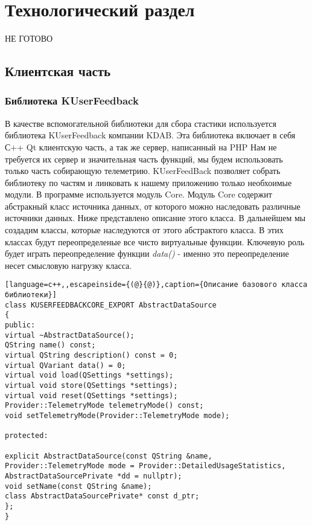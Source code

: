 \chapter{Технологический раздел}
НЕ ГОТОВО
\section{Клиентская часть}

\subsection{Библиотека KUserFeedback}

В качестве вспомогательной библиотеки для сбора стастики используется библиотека KUserFeedback компании KDAB. Эта библиотека включает в себя С++ Qt клиентскую часть, а так же сервер, написанный на PHP\cite{book3} Нам не требуется их сервер и значительная часть функций, мы будем использовать только часть собирающую телеметрию. KUserFeedBack позволяет  собрать библиотеку по частям и линковать к нашему приложению только необхоимые модули. В программе используется модуль Core. Модуль Core содержит абстракный класс источника данных, от которого можно наследовать различные источники данных. Ниже представлено описание этого класса. В дальнейшем мы создадим классы, которые наследуются от этого абстрактого класса. В этих классах будут переопределеные все чисто виртуальные функции. Ключевую роль будет играть переопределение функции \textit{data()} - именно это переопределение несет смысловую нагрузку класса.
\begin{lstlisting}[language=c++,,escapeinside={(@}{@)},caption={Описание базового класса библиотеки}] 
class KUSERFEEDBACKCORE_EXPORT AbstractDataSource
{
public:
virtual ~AbstractDataSource();
QString name() const;
virtual QString description() const = 0;
virtual QVariant data() = 0;
virtual void load(QSettings *settings);  
virtual void store(QSettings *settings);
virtual void reset(QSettings *settings);
Provider::TelemetryMode telemetryMode() const;
void setTelemetryMode(Provider::TelemetryMode mode);

protected:

explicit AbstractDataSource(const QString &name, Provider::TelemetryMode mode = Provider::DetailedUsageStatistics, AbstractDataSourcePrivate *dd = nullptr);
void setName(const QString &name);
class AbstractDataSourcePrivate* const d_ptr;
};
}


\end{lstlisting}
